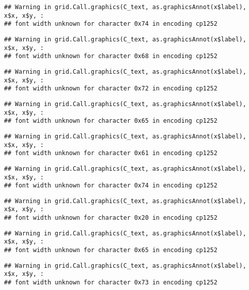 \documentclass[
]{article}
\begin{document}
\begin{verbatim}
## Warning in grid.Call.graphics(C_text, as.graphicsAnnot(x$label), x$x, x$y, :
## font width unknown for character 0x74 in encoding cp1252
\end{verbatim}

\begin{verbatim}
## Warning in grid.Call.graphics(C_text, as.graphicsAnnot(x$label), x$x, x$y, :
## font width unknown for character 0x68 in encoding cp1252
\end{verbatim}

\begin{verbatim}
## Warning in grid.Call.graphics(C_text, as.graphicsAnnot(x$label), x$x, x$y, :
## font width unknown for character 0x72 in encoding cp1252
\end{verbatim}

\begin{verbatim}
## Warning in grid.Call.graphics(C_text, as.graphicsAnnot(x$label), x$x, x$y, :
## font width unknown for character 0x65 in encoding cp1252
\end{verbatim}

\begin{verbatim}
## Warning in grid.Call.graphics(C_text, as.graphicsAnnot(x$label), x$x, x$y, :
## font width unknown for character 0x61 in encoding cp1252
\end{verbatim}

\begin{verbatim}
## Warning in grid.Call.graphics(C_text, as.graphicsAnnot(x$label), x$x, x$y, :
## font width unknown for character 0x74 in encoding cp1252
\end{verbatim}

\begin{verbatim}
## Warning in grid.Call.graphics(C_text, as.graphicsAnnot(x$label), x$x, x$y, :
## font width unknown for character 0x20 in encoding cp1252
\end{verbatim}

\begin{verbatim}
## Warning in grid.Call.graphics(C_text, as.graphicsAnnot(x$label), x$x, x$y, :
## font width unknown for character 0x65 in encoding cp1252
\end{verbatim}

\begin{verbatim}
## Warning in grid.Call.graphics(C_text, as.graphicsAnnot(x$label), x$x, x$y, :
## font width unknown for character 0x73 in encoding cp1252
\end{verbatim}
\end{document}
